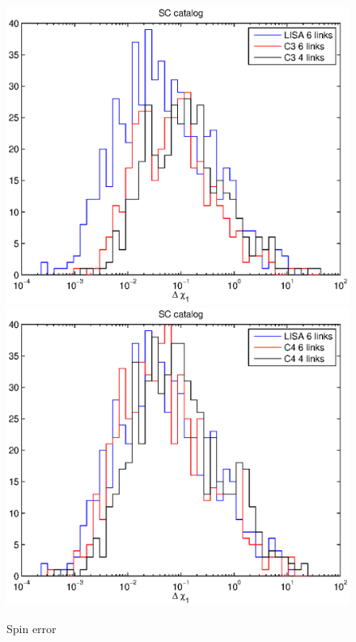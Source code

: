 \documentclass{iopart}
\begin{document}
\begin{figure}[H]
\includegraphics[scale=0.54]{FigSMBHRyanNeil/SCchi13.eps}
\includegraphics[scale=0.54]{FigSMBHRyanNeil/SCchi14.eps}
\caption{Spin error}
\end{figure}
\end{document}

